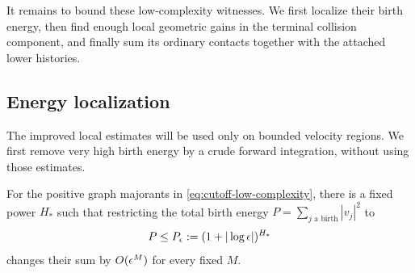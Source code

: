 It remains to bound these low-complexity witnesses. We first localize
their birth energy, then find enough local geometric gains in the
terminal collision component, and finally sum its ordinary contacts
together with the attached lower histories.

\subsection{Energy localization}

The improved local estimates will be used only on bounded velocity
regions. We first remove very high birth energy by a crude forward
integration, without using those estimates.

\begin{lemma}\label{lem:cutoff-energy-tail}
For the positive graph majorants in
\eqref{eq:cutoff-low-complexity}, there is a fixed power \(H_*\)
such that restricting the total birth energy
\(P=\sum_{j\text{ a birth}}|v_j|^2\) to
\[
 P\leq P_{\epsilon}:=(1+|\log\epsilon|)^{H_*}
\]
changes their sum by \(O(\epsilon^M)\) for every fixed \(M\).
\end{lemma}

